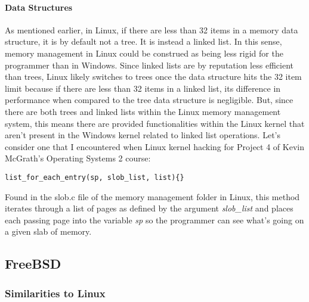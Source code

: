 \documentclass[letterpaper,10pt,titlepage]{article}
\begin{document}
\paragraph{Data Structures}
As mentioned earlier, in Linux, if there are less than 32 items in a memory data structure, it is by default not a tree. It is instead a linked list. In this sense, memory management in Linux could be construed as being less rigid for the programmer than in Windows. Since linked lists are by reputation less efficient than trees, Linux likely switches to trees once the data structure hits the 32 item limit because if there are less than 32 items in a linked list, its difference in performance when compared to the tree data structure is negligible. But, since there are both trees and linked lists within the Linux memory management system, this means there are provided functionalities within the Linux kernel that aren't present in the Windows kernel related to linked list operations. Let's consider one that I encountered when Linux kernel hacking for Project 4 of Kevin McGrath's Operating Systems 2 course: 
\begin{lstlisting}
list_for_each_entry(sp, slob_list, list){}
\end{lstlisting}
Found in the slob.c file of the memory management folder in Linux, this method iterates through a list of pages as defined by the argument \emph{slob\_list} 
and places each passing page into the variable \emph{sp} so the programmer can see what's going on a given slab of memory.

\subsection{FreeBSD}


% 
%
%
\subsubsection{Similarities to Linux}
\end{document}
